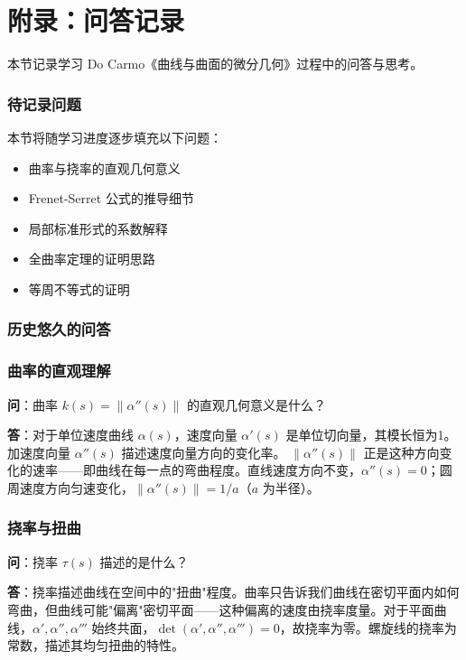 \chapter*{附录：问答记录}
\label{chap:Appendix}

本节记录学习 Do Carmo《曲线与曲面的微分几何》过程中的问答与思考。

\subsection*{待记录问题}

本节将随学习进度逐步填充以下问题：

\begin{itemize}
\item 曲率与挠率的直观几何意义
\item Frenet-Serret 公式的推导细节
\item 局部标准形式的系数解释
\item 全曲率定理的证明思路
\item 等周不等式的证明
\end{itemize}

\subsection*{历史悠久的问答}


\subsection*{曲率的直观理解}\label{sec:qa-curvature-intuition}

\textbf{问}：曲率 $k(s) = \|\alpha''(s)\|$ 的直观几何意义是什么？

\textbf{答}：对于单位速度曲线 $\alpha(s)$，速度向量 $\alpha'(s)$ 是单位切向量，其模长恒为1。加速度向量 $\alpha''(s)$ 描述速度向量方向的变化率。 $\|\alpha''(s)\|$ 正是这种方向变化的速率——即曲线在每一点的弯曲程度。直线速度方向不变，$\alpha''(s) = 0$；圆周速度方向匀速变化，$\|\alpha''(s)\| = 1/a$（$a$ 为半径）。

\subsection*{挠率与扭曲}\label{sec:qa-torsion}

\textbf{问}：挠率 $\tau(s)$ 描述的是什么？

\textbf{答}：挠率描述曲线在空间中的"扭曲"程度。曲率只告诉我们曲线在密切平面内如何弯曲，但曲线可能"偏离"密切平面——这种偏离的速度由挠率度量。对于平面曲线，$\alpha', \alpha'', \alpha'''$ 始终共面，$\det(\alpha', \alpha'', \alpha''') = 0$，故挠率为零。螺旋线的挠率为常数，描述其均匀扭曲的特性。


